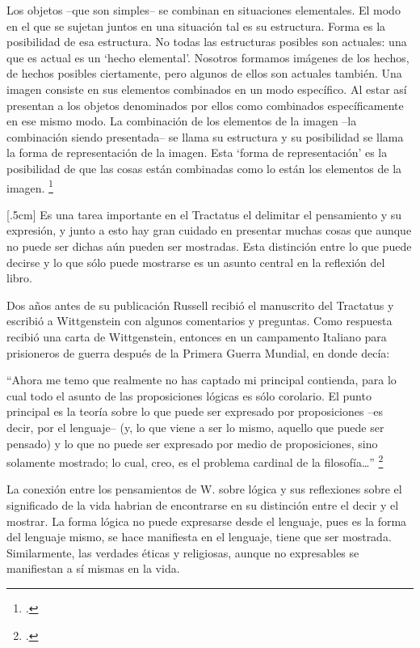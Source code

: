 \documentclass[../main.tex]{subfiles}
\begin{document}
Los objetos --que son simples-- se combinan en situaciones elementales. El modo en el que se sujetan juntos en una situación tal es su estructura. Forma es la posibilidad de esa estructura. No todas las estructuras posibles son actuales: una que es actual es un `hecho elemental'. Nosotros formamos imágenes de los hechos, de hechos posibles ciertamente, pero algunos de ellos son actuales también. Una imagen consiste en sus elementos combinados en un modo específico. Al estar así presentan a los objetos denominados por ellos como combinados específicamente en ese mismo modo. La combinación de los elementos de la imagen --la combinación siendo presentada-- se llama su estructura y su posibilidad se llama la forma de representación de la imagen. 
Esta `forma de representación' es la posibilidad de que las cosas están combinadas como lo están los elementos de la imagen. \footcite[p. 171]{simplicity}

[.5cm]
Es una tarea importante en el Tractatus el delimitar el pensamiento y su expresión, y junto a esto hay gran cuidado en presentar muchas cosas que aunque no puede ser dichas aún pueden ser mostradas. Esta distinción entre lo que puede decirse y lo que sólo puede mostrarse es un asunto central en la reflexión del libro. 

Dos años antes de su publicación Russell recibió el manuscrito del Tractatus y escribió a Wittgenstein con algunos comentarios y preguntas. Como respuesta recibió una carta de Wittgenstein, entonces en un campamento Italiano para prisioneros de guerra después de la Primera Guerra Mundial, en donde decía:

``Ahora me temo que realmente no has captado mi principal contienda, para lo cual todo el asunto de las proposiciones lógicas es sólo corolario. El punto principal es la teoría sobre lo que puede ser expresado por proposiciones --es decir, por el lenguaje-- (y, lo que viene a ser lo mismo, aquello que puede ser pensado) y lo que no puede ser expresado por medio de proposiciones, sino solamente mostrado; lo cual, creo, es el problema cardinal de la filosofía\ldots'' \footcite[p. 161]{IWT}

La conexión entre los pensamientos de W. sobre lógica y sus reflexiones sobre el significado de la vida habrian de encontrarse en su distinción entre el decir y el mostrar. La forma lógica no puede expresarse desde el lenguaje, pues es la forma del lenguaje mismo, se hace manifiesta en el lenguaje, tiene que ser mostrada. Similarmente, las verdades éticas y religiosas, aunque no expresables se manifiestan a sí mismas en la vida. 
\end{document}
